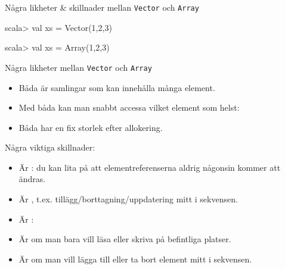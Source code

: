 \begin{Slide}{Några likheter \& skillnader mellan \texttt{Vector} och \texttt{Array}}\SlideFontSmall
\begin{multicols}{2}
\begin{REPL}[numbers=none]
scala> val xs = Vector(1,2,3)
\end{REPL}

\columnbreak

\begin{REPL}[numbers=none]
scala> val xs = Array(1,2,3)
\end{REPL}
\end{multicols}


Några likheter mellan \texttt{Vector} och \texttt{Array}
\begin{itemize}
\item Båda är samlingar som kan innehålla många element.

\item Med båda kan man snabbt accessa vilket element som helst: 

\item Båda har en fix storlek efter allokering.
\end{itemize}

Några viktiga skillnader:
\begin{multicols}{2}
\begin{itemize}
\item Är : du kan lita på att elementreferenserna aldrig någonsin kommer att ändras.

\item Är , t.ex. tillägg/borttagning/uppdatering mitt i sekvensen.

\end{itemize}


\columnbreak

\begin{itemize}
\item Är : 

\item Är  om man bara vill läsa eller skriva på befintliga platser.

\item Är  om man vill lägga till eller ta bort element mitt i sekvensen.

\end{itemize}
\end{multicols}
\end{Slide}



